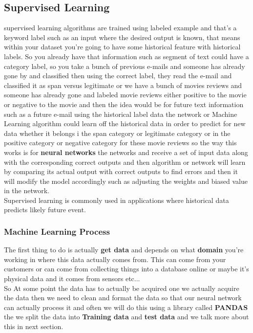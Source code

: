 \documentclass[12pt]{article}
\begin{document}
\subsection{Supervised Learning}
supervised learning algorithms are trained using labeled example and that's a keyword label such as an input where the desired output is known, that means within your dataset you're going to have some historical feature with historical labels.
So you already have that information such as segment of text could have a category label, so you take a bunch of previous e-mails and someone has already gone by and classified then using the correct label, they read the e-mail and classified it as span versus legitimate or we have a bunch of movies reviews and someone has already gone and labeled movie reviews either positive to the movie or negative to the movie and then the idea would be for future text information such as a future e-mail using the historical label data the network or Machine Learning algorithm could learn off the historical data in order to predict for new data whether it belongs i the span category or legitimate category or in the   positive category or negative category for these movie reviews so the way this works is for \textbf{neural networks} the networks and receive a set of input data along with the corresponding correct outputs and then algorithm or  network will learn by comparing its actual output with correct outputs to find errors and then it will modify the model accordingly such as adjusting the weights and biased value in the network.\\
Supervised learning is commonly used in applications where historical data predicts likely future event.\\

\subsubsection{Machine Learning Process}
The first thing to do is actually \textbf{get data} and depends on what \textbf{domain} you're working in where this data actually comes from. This can come from your customers or can come from collecting things into a database online or maybe it's physical data and it comes from sensors etc...\\

So At some point the data has to actually be acquired one we actually acquire the data then we need to clean and format the data so that our neural network can actually process it and often we will do this using a library called \textbf{PANDAS} the we split the data into \textbf{Training data} and \textbf{test data} and we talk more about this in next section. 
\end{document}
